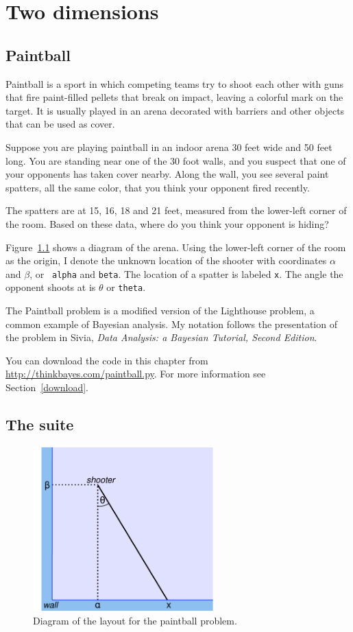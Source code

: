 \documentclass[12pt]{book}
\begin{document}
\chapter{Two dimensions}
\label{paintball}

\section{Paintball}

Paintball is a sport in which competing teams try to shoot each other
with guns that fire paint-filled pellets that break on impact, leaving
a colorful mark on the target.  It is usually played in an
arena decorated with barriers and other objects that can be
used as cover.

Suppose you are playing paintball in an indoor arena 30 feet
wide and 50 feet long.  You are standing near one of the 30 foot
walls, and you suspect that one of your opponents has taken cover
nearby.  Along the wall, you see several paint spatters, all the same
color, that you think your opponent fired recently.

The spatters are at 15, 16, 18 and 21 feet, measured from the
lower-left corner of the room.  Based on these data, where do you
think your opponent is hiding?

Figure~\ref{fig.paintball} shows a diagram of the arena.  Using the
lower-left corner of the room as the origin, I denote the unknown
location of the shooter with coordinates $\alpha$ and $\beta$, or {\tt
  alpha} and {\tt beta}.  The location of a spatter is labeled
{\tt x}.  The angle the opponent shoots at is $\theta$ or {\tt theta}.

The Paintball problem is a modified version
of the Lighthouse problem, a common example of Bayesian analysis.  My
notation follows the presentation of the problem in Sivia, {\it Data
  Analysis: a Bayesian Tutorial, Second Edition}.

You can download the code in this chapter from
\url{http://thinkbayes.com/paintball.py}.
  For more information
see Section~\ref{download}.

\section{The suite}

\begin{figure}
\centerline{\includegraphics[height=2.5in]{figs/paintball.pdf}}
\caption{Diagram of the layout for the paintball problem.}
\label{fig.paintball}
\end{figure}
\end{document}
